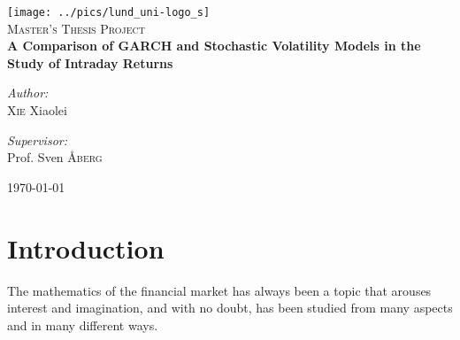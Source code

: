 \documentclass{report}
\author{Xie Xiaolei}
\date{\today}
\begin{document}
\begin{titlepage}
\begin{center}

\texttt{[image: ../pics/lund\_uni-logo\_s]}~\\[1cm]


\textsc{\Large Master's Thesis Project}\\[0.5cm]

{ \huge \bfseries A Comparison of GARCH and Stochastic Volatility Models in
  the Study of Intraday Returns \\[0.4cm] }


\begin{minipage}{0.4\textwidth}
\begin{flushleft} \large
\emph{Author:}\\
\textsc{Xie} Xiaolei
\end{flushleft}
\end{minipage}
\begin{minipage}{0.4\textwidth}
\begin{flushright} \large
\emph{Supervisor:} \\
Prof. Sven \textsc{\AA berg}
\end{flushright}
\end{minipage}

\vfill

{\large \today}

\end{center}
\end{titlepage}
\tableofcontents

\chapter{Introduction}
The mathematics of the financial market has always been a topic that
arouses interest and imagination, and with no doubt, has been
studied from many aspects and in many different ways.
\end{document}
